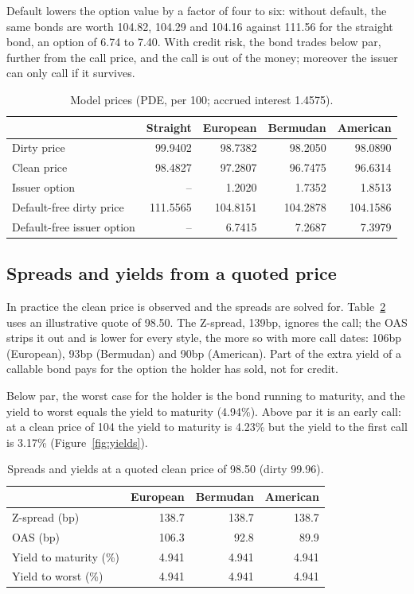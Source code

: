 \documentclass[11pt,a4paper]{article}
\begin{document}
Default lowers the option value by a factor of four to six: without default, the same bonds are worth 104.82, 104.29 and
104.16 against 111.56 for the straight bond, an option of 6.74 to 7.40. With credit risk, the bond trades below par,
further from the call price, and the call is out of the money; moreover the issuer can only call if it survives.

\begin{table}[h]
\centering
\begin{tabular}{@{}lrrrr@{}}
\toprule
& \textbf{Straight} & \textbf{European} & \textbf{Bermudan} & \textbf{American} \\
\midrule
Dirty price & 99.9402 & 98.7382 & 98.2050 & 98.0890 \\
Clean price & 98.4827 & 97.2807 & 96.7475 & 96.6314 \\
Issuer option & -- & 1.2020 & 1.7352 & 1.8513 \\
Default-free dirty price & 111.5565 & 104.8151 & 104.2878 & 104.1586 \\
Default-free issuer option & -- & 6.7415 & 7.2687 & 7.3979 \\
\bottomrule
\end{tabular}
\caption{Model prices (PDE, per 100; accrued interest 1.4575).}
\label{tab:prices}
\end{table}

\subsection{Spreads and yields from a quoted price}
In practice the clean price is observed and the spreads are solved for. Table~\ref{tab:market} uses an illustrative
quote of 98.50. The Z-spread, 139bp, ignores the call; the OAS strips it out and is lower for every style, the more so
with more call dates: 106bp (European), 93bp (Bermudan) and 90bp (American). Part of the extra yield of a callable bond
pays for the option the holder has sold, not for credit.

Below par, the worst case for the holder is the bond running to maturity, and the yield to worst equals the yield to
maturity (4.94\%). Above par it is an early call: at a clean price of 104 the yield to maturity is 4.23\% but the yield
to the first call is 3.17\% (Figure~\ref{fig:yields}).

\begin{table}[h]
\centering
\begin{tabular}{@{}lrrr@{}}
\toprule
& \textbf{European} & \textbf{Bermudan} & \textbf{American} \\
\midrule
Z-spread (bp) & 138.7 & 138.7 & 138.7 \\
OAS (bp) & 106.3 & 92.8 & 89.9 \\
Yield to maturity (\%) & 4.941 & 4.941 & 4.941 \\
Yield to worst (\%) & 4.941 & 4.941 & 4.941 \\
\bottomrule
\end{tabular}
\caption{Spreads and yields at a quoted clean price of 98.50 (dirty 99.96).}
\label{tab:market}
\end{table}
\end{document}
